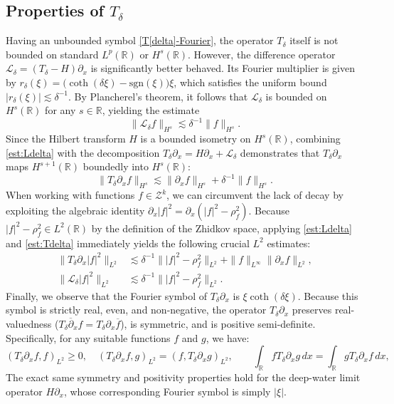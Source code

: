 \documentclass{amsart}
\numberwithin{equation}{section}
\newcommand{\R}{\mathbb{R}}
\newcommand{\Td}{T_{\delta}}
\begin{document}
\subsection{Properties of \texorpdfstring{$\Td$}{T[delta]}}

Having an unbounded symbol \eqref{T[delta]-Fourier}, the operator $\Td$ itself is not bounded on standard $L^p(\R)$ or $H^s(\R)$.
However, the difference operator $\mathcal{L}_\delta = (\Td - H)\partial_x$ is significantly better behaved. Its Fourier multiplier is given by $r_\delta(\xi) = \big(\coth(\delta\xi) - \mathrm{sgn}(\xi)\big)\xi$, which satisfies the uniform bound $|r_\delta(\xi)| \lesssim \delta^{-1}$. By Plancherel's theorem, it follows that $\mathcal{L}_\delta$ is bounded on $H^s(\R)$ for any $s \in \R$, yielding the estimate
\begin{equation}\label{est:Ldelta}
\| \mathcal{L}_\delta f\|_{H^s}\lesssim \delta^{-1}\| f\|_{H^s}.
\end{equation}
Since the Hilbert transform $H$ is a bounded isometry on $H^s(\R)$, combining \eqref{est:Ldelta} with the decomposition $\Td\partial_x = H\partial_x + \mathcal{L}_\delta$ demonstrates that $\Td\partial_x$ maps $H^{s+1}(\R)$ boundedly into $H^s(\R)$:
\begin{equation}\label{est:Tdelta}
\| \Td\partial_xf\|_{H^s}\lesssim \| \partial_xf\|_{H^s}+\delta^{-1}\| f\|_{H^s} .
\end{equation}
When working with functions $f \in \mathcal{Z}^k$, we can circumvent the lack of decay by exploiting the algebraic identity $\partial_x|f|^2 = \partial_x(|f|^2 - \rho_f^2)$. Because $|f|^2 - \rho_f^2 \in L^2(\R)$ by the definition of the Zhidkov space, applying \eqref{est:Ldelta} and \eqref{est:Tdelta} immediately yields the following crucial $L^2$ estimates:
\begin{equation}\label{est:TLonZ}
\begin{aligned}
\| \Td\partial_x|f|^2\|_{L^2}&\lesssim \delta^{-1}\big\| |f|^2-\rho_{f}^2\big\|_{L^2}+\| f\|_{L^\infty}\| \partial_xf\|_{L^2},\\
\| \mathcal{L}_\delta |f|^2\|_{L^2}&\lesssim \delta^{-1}\big\| |f|^2-\rho_{f}^2\big\|_{L^2}. \end{aligned}
\end{equation}
Finally, we observe that the Fourier symbol of $\Td\partial_x$ is $\xi \coth(\delta \xi)$. Because this symbol is strictly real, even, and non-negative, the operator $\Td\partial_x$ preserves real-valuedness ($\overline{\Td\partial_xf} = \Td\partial_x\overline{f}$), is symmetric, and is positive semi-definite. Specifically, for any suitable functions $f$ and $g$, we have:
\begin{equation}\label{id:Tdeltasymm}
\left( \Td\partial_xf,f\right)_{L^2} \geq 0,\quad \left( \Td\partial_x f,g\right)_{L^2} =\left( f,\Td\partial_xg\right)_{L^2} ,\qquad \int_{\R} f\Td\partial_xg\,dx=\int_{\R}g\Td\partial_xf\,dx ,
\end{equation}
The exact same symmetry and positivity properties hold for the deep-water limit operator $H\partial_x$, whose corresponding Fourier symbol is simply $|\xi|$.
\end{document}
